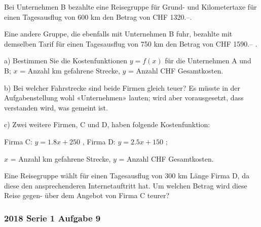 Bei Unternehmen B bezahlte eine Reisegruppe für Grund- und Kilometertaxe für einen
Tagesausflug von 600 km den Betrag von CHF 1320.--.

Eine andere Gruppe, die ebenfalls mit Unternehmen B fuhr, bezahlte mit demselben
Tarif für einen Tagesausflug von 750 km den Betrag von CHF 1590.-- .

a) Bestimmen Sie die Kostenfunktionen $y = f(x)$ für die Unternehmen A und B;
$x$ = Anzahl km gefahrene Strecke, $y$ = Anzahl CHF Gesamtkosten.


b)  Bei welcher Fahrstrecke sind beide Firmen gleich teuer?
{\small Es müsste in der Aufgabenstellung wohl «Unternehmen» lauten; wird aber vorausgesetzt, dass verstanden wird, was gemeint ist.}



c) 
Zwei weitere Firmen, C und D, haben folgende Kostenfunktion:

Firma C: $y = 1.8x + 250$ , Firma D: $y = 2.5x + 150$ ;

$x$ = Anzahl km gefahrene Strecke, $y$ = Anzahl CHF Gesamtkosten.

Eine Reisegruppe wählt für einen Tagesausflug von 300 km Länge Firma D, da diese
den ansprechenderen Internetauftritt hat. Um welchen Betrag wird diese Reise gegen-
über dem Angebot von Firma C teurer?



\subsubsection{2018 Serie 1 Aufgabe 9}

